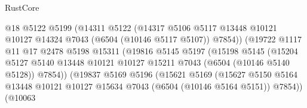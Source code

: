 \begin{lexlean}{RustCore}
\begin{coremodule}
                                    @18
                                    @5122
                                    @5199
                                    (@14311
                                      @5122
                                      (@14317
                                        @5106
                                        @5117
                                        @13448
                                        @10121
                                        @10127
                                        @14324
                                        @7043
                                        (@6504 (@10146 @5117 @5107))
                                        @7854))
                                    (@19722
                                      @1117
                                      @11
                                      @17
                                      @2478
                                      @5198
                                      @15311
                                      (@19816
                                        @5145
                                        @5197
                                        (@15198
                                          @5145
                                          (@15204
                                            @5127
                                            @5140
                                            @13448
                                            @10121
                                            @10127
                                            @15211
                                            @7043
                                            (@6504 (@10146 @5140 @5128))
                                            @7854))
                                        (@19837
                                          @5169
                                          @5196
                                          (@15621
                                            @5169
                                            (@15627
                                              @5150
                                              @5164
                                              @13448
                                              @10121
                                              @10127
                                              @15634
                                              @7043
                                              (@6504 (@10146 @5164 @5151))
                                              @7854))
                                          (@10063

\end{coremodule}
\end{lexlean}
